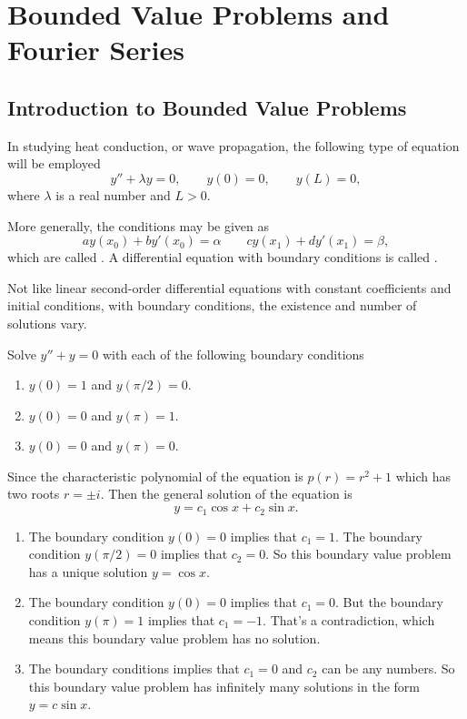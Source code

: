 \chapter{Bounded Value Problems and Fourier Series}

\section{Introduction to Bounded Value Problems}

In studying heat conduction, or wave propagation, the following type of equation will be employed
\[y''+\lambda y=0, \qquad y(0)=0, \qquad y(L)=0,\]
where $\lambda$ is a real number and  $L>0$.

More generally, the conditions may be given as
\[ay(x_0)+by'(x_0)=\alpha \qquad cy(x_1)+dy'(x_1)=\beta,\]
which are called . A differential equation with boundary conditions is called .

Not like linear second-order differential equations with constant coefficients and initial conditions,  with boundary conditions, the existence and number of solutions vary.

\begin{example}
  Solve $y''+ y=0$ with each of the following boundary conditions 
  \begin{enumerate}
    \item $y(0)=1$ and $y(\pi/2)=0$.
    \item $y(0)=0$ and $y(\pi)=1$.
    \item $y(0)=0$ and $y(\pi)=0$.
  \end{enumerate}
\end{example}
\begin{solution}
  Since the characteristic polynomial of the equation is $p(r)=r^2+1$ which has two roots $r=\pm i$. Then the general solution of the equation is
  \[y=c_1\cos x +c_2\sin x.\]

  \begin{enumerate}
    \item The boundary condition $y(0)=0$ implies that $c_1   = 1$. The boundary condition $y(\pi/2)=0$ implies that $c_2=0$. So this boundary value problem has a unique solution $y=\cos x$.
    \item  The boundary condition $y(0)=0$ implies that $c_1   = 0$. But the boundary condition $y(\pi)=1$ implies that $c_1=-1$. That's a contradiction, which means this boundary value problem has no solution.
    \item The boundary conditions implies that $c_1   = 0$ and $c_2$ can be any numbers. So this boundary value problem has infinitely many solutions in the form $y=c\sin x$. 
  \end{enumerate}
\end{solution}

